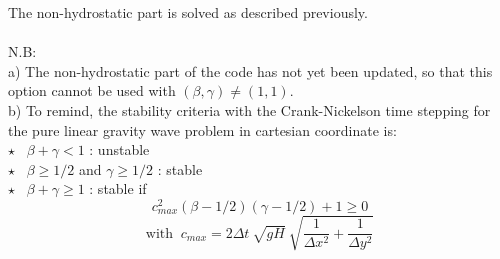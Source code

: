 The non-hydrostatic part is solved as described previously. 
\\ \\
N.B:
\\
 a) The non-hydrostatic part of the code has not yet been 
updated, %
so that this option cannot be used with $(\beta,\gamma) \neq (1,1)$.
\\
b) To remind, the stability criteria with the Crank-Nickelson time stepping
for the pure linear gravity wave problem in cartesian coordinate is:
\\
$\star$~ $\beta + \gamma < 1$ : unstable
\\
$\star$~ $\beta \geq 1/2$ and $ \gamma \geq 1/2$ : stable
\\
$\star$~ $\beta + \gamma \geq 1$ : stable if
$$ 
c_{max}^2 (\beta - 1/2)(\gamma - 1/2) + 1 \geq 0
$$
$$
\mbox{with }~
c_{max} =  2 \Delta t \: \sqrt{g H} \: 
\sqrt{ \frac{1}{\Delta x^2} + \frac{1}{\Delta y^2} }
$$

